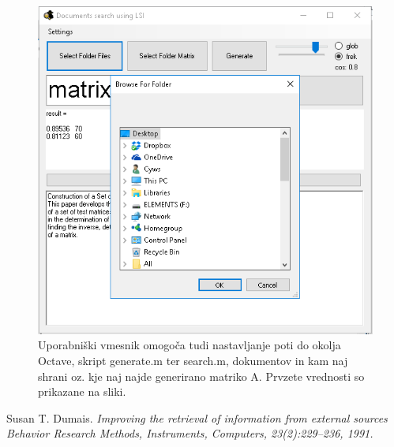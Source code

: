 \documentclass{article}
\begin{document}
\begin{figure}[h]
 \centering
    \includegraphics[width=.8\linewidth]{browseDialog}
    \caption{Uporabniški vmesnik omogoča tudi nastavljanje poti do okolja Octave, skript generate.m ter search.m,  dokumentov in kam naj shrani oz. kje naj najde generirano matriko A. Prvzete vrednosti so prikazane na sliki.}
    \label{slika:UI4}
\end{figure}


\begin{thebibliography}{9}
Susan T. Dumais. 
\textit{ Improving the retrieval of information from external sources Behavior Research Methods, Instruments,  Computers, 23(2):229–236, 1991.}
\end{thebibliography}
\end{document}
